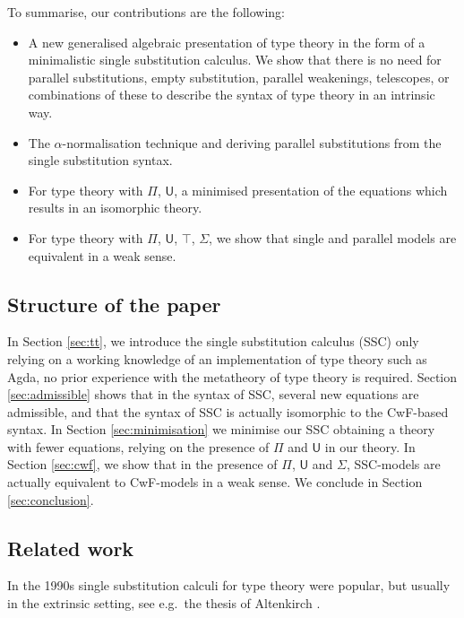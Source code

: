\documentclass[sigplan,10pt,anonymous,review]{acmart}\settopmatter{printfolios=true,printccs=false,printacmref=false}
\newcommand{\U}{\mathsf{U}}
\begin{document}
To summarise, our contributions are the following:
\begin{itemize}
\item A new generalised algebraic presentation of type theory in the
  form of a minimalistic single substitution calculus. We show that
  there is no need for parallel substitutions, empty substitution,
  parallel weakenings, telescopes, or combinations of these to
  describe the syntax of type theory in an intrinsic way.
\item The $\alpha$-normalisation technique and deriving parallel
  substitutions from the single substitution syntax.
\item For type theory with $\Pi$, $\U$, a minimised presentation of
  the equations which results in an isomorphic theory.
\item For type theory with $\Pi$, $\U$, $\top$, $\Sigma$, we show that
  single and parallel models are equivalent in a weak sense.
\end{itemize}

\subsection{Structure of the paper}

In Section \ref{sec:tt}, we introduce the single substitution calculus
(SSC) only relying on a working knowledge of an implementation of type
theory such as Agda, no prior experience with the metatheory of type
theory is required. Section \ref{sec:admissible} shows that in the
syntax of SSC, several new equations are admissible, and that the
syntax of SSC is actually isomorphic to the CwF-based syntax. In
Section \ref{sec:minimisation} we minimise our SSC obtaining a theory
with fewer equations, relying on the presence of $\Pi$ and $\U$ in our
theory. In Section \ref{sec:cwf}, we show that in the presence of
$\Pi$, $\U$ and $\Sigma$, SSC-models are actually equivalent to
CwF-models in a weak sense. We conclude in Section
\ref{sec:conclusion}.

\subsection{Related work}

In the 1990s single substitution calculi for type theory were popular,
but usually in the extrinsic setting, see e.g.\ the thesis of
Altenkirch \cite{alti:phd93}.
\end{document}
